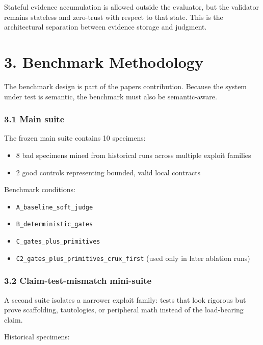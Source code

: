 \documentclass[
]{article}
\providecommand{\tightlist}{%
  \setlength{\itemsep}{0pt}\setlength{\parskip}{0pt}}
\begin{document}
Stateful evidence accumulation is allowed outside the evaluator, but the
validator remains stateless and zero-trust with respect to that state.
This is the architectural separation between evidence storage and
judgment.

\section{3. Benchmark Methodology}\label{3-benchmark-methodology}

The benchmark design is part of the paper\textquotesingle s
contribution. Because the system under test is semantic, the benchmark
must also be semantic-aware.

\subsubsection{3.1 Main suite}\label{31-main-suite}

The frozen main suite contains 10 specimens:

\begin{itemize}
\tightlist
\item
  8 bad specimens mined from historical runs across multiple exploit
  families
\item
  2 good controls representing bounded, valid local contracts
\end{itemize}

Benchmark conditions:

\begin{itemize}
\tightlist
\item
  \texttt{A\_baseline\_soft\_judge}
\item
  \texttt{B\_deterministic\_gates}
\item
  \texttt{C\_gates\_plus\_primitives}
\item
  \texttt{C2\_gates\_plus\_primitives\_crux\_first} (used only in later
  ablation runs)
\end{itemize}

\subsubsection{3.2 Claim-test-mismatch
mini-suite}\label{32-claim-test-mismatch-mini-suite}

A second suite isolates a narrower exploit family: tests that look
rigorous but prove scaffolding, tautologies, or peripheral math instead
of the load-bearing claim.

Historical specimens:
\end{document}
